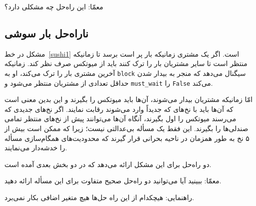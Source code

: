 \documentclass{book}
\newcommand{\clearemptydoublepage}{\newpage\cleardoublepage}
\begin{document}
    معمّا: این راه‌حل چه مشکلی دارد؟


\clearemptydoublepage
\subsection{ناراه‌حل بار سوشی}

    مشکل در خط~\ref{sushi1} است. اگر یک مشتری زمانیکه بار پر است برسد تا زمانیکه منتظر است تا سایر مشتریان بار را ترک کنند باید از میوتکس 
    صرف نظر کند. زمانیکه آخرین مشتری بار را ترک می‌کند، او به {\tt block} سیگنال می‌دهد که منجر به بیدار شدن حداقل تعدادی از مشتریان منتظر 
    می‌شود و {\tt must\_wait} را \texttt{False} می‌کند. 
    

    امّا زمانیکه مشتریان بیدار می‌شوند، آن‌ها باید میوتکس را بگیرند و این بدین معنی است که آن‌ها باید با نخ‌های که جدیداً وارد می‌شوند رقابت نمایند. 
    اگر نخ‌های جدیدی که می‌رسند میوتکس را اول بگیرند، آنگاه آن‌ها می‌توانند پیش از نخ‌های منتظر تمامی صندلی‌ها را بگیرند. این فقط یک مسأله بی‌عدالتی
    نیست؛ زیرا که ممکن است بیش از ۵ نخ به طور همزمان در ناحیه بحرانی قرار گیرند که محدودیت‌های همگام‌سازی مسأله را خدشه‌دار می‌نمایند. 

    دو راه‌حل برای این مشکل ارائه می‌دهد که در دو بخش بعدی آمده است. 

    معمّا: ببینید آیا می‌توانید دو راه‌حل صحیح متفاوت برای این مسأله ارائه دهید. 

    راهنمایی: هیچکدام از این راه حل‌ها هیچ متغیر اضافی بکار نمی‌برد. 
\end{document}
